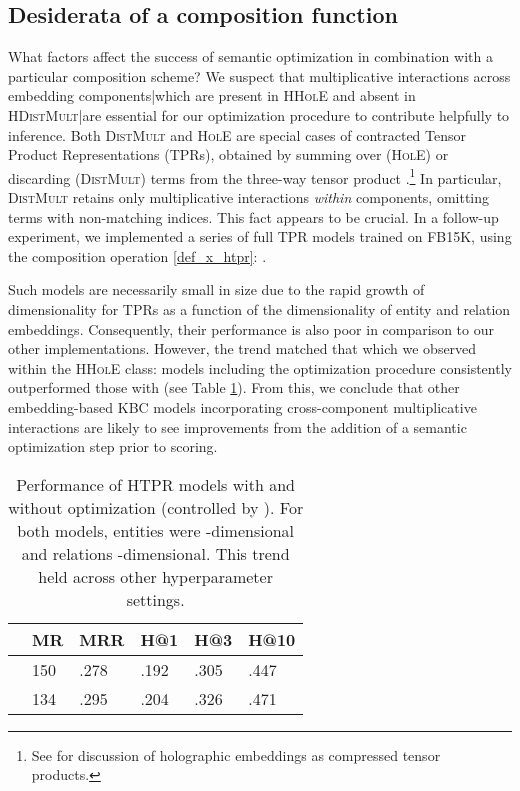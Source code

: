 \documentclass[a4paper,10pt]{article}
\begin{document}
\subsection{Desiderata of a composition function}
What factors affect the success of semantic optimization in combination with a particular composition scheme? We suspect that multiplicative interactions across embedding components|which are present in \textsc{HHolE} and absent in \textsc{HDistMult}|are essential for our optimization procedure to contribute helpfully to inference. Both \textsc{DistMult} and \textsc{HolE} are special cases of contracted Tensor Product Representations (\textsc{TPR}s), obtained by summing over (\textsc{HolE}) or discarding (\textsc{DistMult}) terms from the three-way tensor product .\footnote{See \citep{nickel2016hole} for discussion of holographic embeddings as compressed tensor products.} In particular, \textsc{DistMult} retains only multiplicative interactions \emph{within} components, omitting terms with non-matching indices. This fact appears to be crucial. In a follow-up experiment, we implemented a series of full \textsc{TPR} models trained on FB15K, using the composition operation \ref{def_x_htpr}:
\ex.  	\label{def_x_htpr}

Such models are necessarily small in size due to the rapid growth of dimensionality for \textsc{TPR}s as a function of the dimensionality of entity and relation embeddings. Consequently, their performance is also poor in comparison to our other implementations. However, the trend matched that which we observed within the \textsc{HHolE} class: models including the optimization procedure consistently outperformed those with  (see Table \ref{table_HTPR_results}). From this, we conclude that other embedding-based KBC models incorporating cross-component multiplicative interactions are likely to see improvements from the addition of a semantic optimization step prior to scoring.
\begin{table}
\begin{tabular}{l||l|l|l|l|l}
 & \textbf{MR} & \textbf{MRR} & \textbf{H@1} & \textbf{H@3} & \textbf{H@10} \\\hline \hline
 & 150 & .278 & .192 & .305 & .447	\\
 & 134 & .295 & .204 & .326 & .471
\end{tabular}
\caption{Performance of \textsc{HTPR} models with and without optimization (controlled by ). For both models, entities were -dimensional and relations -dimensional. This trend held across other hyperparameter settings.} \label{table_HTPR_results}
\end{table}
\end{document}
